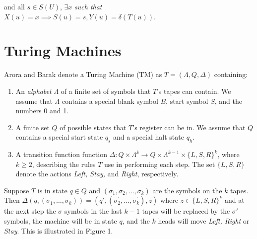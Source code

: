 \documentclass[11pt]{article}
\begin{document}
\quad \quad and all $ s \in S(U) $, $ \exists x $ \textit{ such that } $ X(u) = x \implies S(u) = s, Y(u) = \delta(T(u)) $. \\

\section{Turing Machines} 


 Arora and Barak denote a Turing Machine (TM) as $ T = (\Lambda, Q, \Delta) $ containing:
\begin{enumerate}
\item An \textit{alphabet} $ \Lambda $ of a finite set of symbols that $ T $'s tapes can contain. We assume that $ \Lambda $ contains a special blank symbol $ B $, start symbol $ S $, and the numbers 0 and 1. 
\item A finite set $ Q $ of possible states that $ T $'s register can be in. We assume that $ Q $ contains a special start state $ q_{s} $ and a special halt state $ q_{h} $. 
\item A transition function function $ \Delta : Q \times \Lambda^{k} \rightarrow Q \times \Lambda^{k - 1} \times \{L, S, R\}^{k} $, where $ k \geq 2$, describing the rules $ T $ use in performing each step. The set $\{L ,S, R\}$ denote the actions \textit{Left, Stay,} and \textit{Right}, respectively. 
\end{enumerate}

Suppose $ T $ is in state $ q \in Q $ and $ (\sigma_1, \sigma_2, \dots, \sigma_k) $ are the symbols on the $ k $ tapes. Then $ \Delta(q, (\sigma_1, \dots, \sigma_k)) = (q', (\sigma_{2}^{'}, \dots, \sigma_{k}^{'}), z) $ where $ z \in \{L, S, R\}^k $ and at the next step the $ \sigma $ symbols in the last $ k - 1 $ tapes will be replaced by the $ \sigma' $ symbols, the machine will be in state $ q $, and the $ k $ heads will move \textit{Left, Right} or \textit{Stay}. This is illustrated in Figure 1. \\
\end{document}
